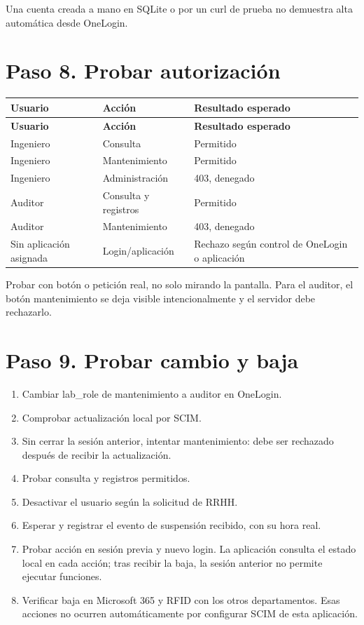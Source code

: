\documentclass[12pt,a4paper]{article}
\begin{document}
Una cuenta creada a mano en SQLite o por un curl de prueba no demuestra alta automática desde OneLogin.\par
{}\section*{Paso 8. Probar autorización}
{\small\renewcommand{\arraystretch}{1.2}
\begin{longtable}{p{5.027cm}p{5.027cm}p{5.027cm}}
\toprule
\textbf{Usuario} & \textbf{Acción} & \textbf{Resultado esperado} \\ \midrule\endfirsthead
\textbf{Usuario} & \textbf{Acción} & \textbf{Resultado esperado} \\ \midrule\endhead
Ingeniero & Consulta & Permitido \\
Ingeniero & Mantenimiento & Permitido \\
Ingeniero & Administración & 403, denegado \\
Auditor & Consulta y registros & Permitido \\
Auditor & Mantenimiento & 403, denegado \\
Sin aplicación asignada & Login/aplicación & Rechazo según control de OneLogin o aplicación \\
\bottomrule\end{longtable}}
Probar con botón o petición real, no solo mirando la pantalla. Para el auditor, el botón mantenimiento se deja visible intencionalmente y el servidor debe rechazarlo.\par
{}\section*{Paso 9. Probar cambio y baja}
\begin{enumerate}
\item Cambiar \textnormal{lab\_\allowbreak{}role} de mantenimiento a auditor en OneLogin.
\item Comprobar actualización local por SCIM.
\item Sin cerrar la sesión anterior, intentar mantenimiento: debe ser rechazado después de recibir la actualización.
\item Probar consulta y registros permitidos.
\item Desactivar el usuario según la solicitud de RRHH.
\item Esperar y registrar el evento de suspensión recibido, con su hora real.
\item Probar acción en sesión previa y nuevo login. La aplicación consulta el estado local en cada acción; tras recibir la baja, la sesión anterior no permite ejecutar funciones.
\item Verificar baja en Microsoft 365 y RFID con los otros departamentos. Esas acciones no ocurren automáticamente por configurar SCIM de esta aplicación.
\end{enumerate}
\end{document}
